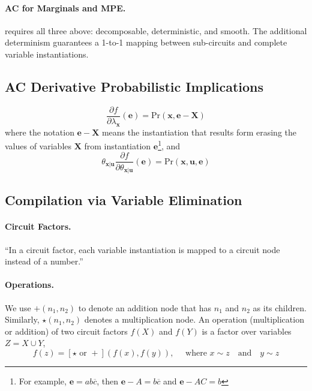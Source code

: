\documentclass[11pt]{article}
\newcommand{\be}{\mathbf{e}}
\newcommand{\bu}{\mathbf{u}}
\newcommand{\bx}{\mathbf{x}}
\newcommand{\pr}{\mathrm{Pr}}
\begin{document}
\paragraph{AC for Marginals and MPE.} requires all three above: decomposable, deterministic, and smooth. The additional determinism guarantees a 1-to-1 mapping between sub-circuits and complete variable instantiations. 

\subsection{AC Derivative Probabilistic Implications}
\begin{equation}
	\frac{\partial f}{\partial \lambda _\bx} (\be) = \pr( \bx, \be - \mathbf X) 
\end{equation}
where the notation $\be - \mathbf X$ means the instantiation that results form erasing the values of variables $\mathbf X$ from instantiation $\be$\footnote{For example, $\mathbf e = ab \overbar c$, then $\be - A = b\overbar c$ and $\be - AC = b$}, and 
\begin{equation}
	\theta_{\bx | \bu} \frac{\partial f}{\partial \theta_{\bx | \bu}} ( \be) = \pr (\bx, \bu, \be)
\end{equation}

\subsection{Compilation via Variable Elimination}
\paragraph{Circuit Factors.}
``In a circuit factor, each variable instantiation is mapped to a circuit node instead of a number.''

\paragraph{Operations.}
We use $+(n_1, n_2)$ to denote an addition node that has $n_1$ and $n_2$ as its children. Similarly, $\star (n_1, n_2)$ denotes a multiplication node. An operation (multiplication or addition) of two circuit factors $f(X)$ and $f(Y)$ is a factor over variables $Z = X \cup Y$, 
\begin{equation}
	f(z) = [\star \text{ or } +]( f(x), f(y)), \quad \text{ where } x \sim z \quad \text{and} \quad y \sim z 
\end{equation}
\end{document}
